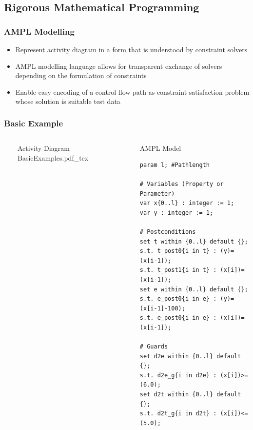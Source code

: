 \documentclass{beamer}
\begin{document}
\subsection{Rigorous Mathematical Programming}
\begin{frame}
\frametitle{AMPL Modelling}
\begin{itemize}
  \item Represent activity diagram in a form that is understood by constraint solvers
\end{itemize}
\vspace{0.3cm}
\begin{itemize}
  \item AMPL modelling language\cite{AMPL} allows for transparent exchange of solvers depending on the formulation of constraints
  \item Enable easy encoding of a control flow path as constraint satisfaction problem whose solution is suitable test data
\end{itemize}
\end{frame}
\begin{frame}[fragile]
\frametitle{Basic Example}
\begin{columns}
  \ 
	\begin{block}{Activity Diagram} 
	\def\svgwidth{\textwidth}
	\scriptsize
	{BasicExamples.pdf_tex}
	\end{block} 
\column{.56\textwidth} \ 
	\begin{block}{AMPL Model} 
		\begin{lstlisting}[basicstyle=\ttfamily\scriptsize,language=ampl]
param l; #Pathlength

# Variables (Property or Parameter)
var x{0..l} : integer := 1;
var y : integer := 1;

# Postconditions
set t within {0..l} default {};
s.t. t_post0{i in t} : (y)=(x[i-1]);
s.t. t_post1{i in t} : (x[i])=(x[i-1]);
set e within {0..l} default {};
s.t. e_post0{i in e} : (y)=(x[i-1]-100);
s.t. e_post0{i in e} : (x[i])=(x[i-1]);

# Guards
set d2e within {0..l} default {};
s.t. d2e_g{i in d2e} : (x[i])>=(6.0);
set d2t within {0..l} default {};
s.t. d2t_g{i in d2t} : (x[i])<=(5.0);
\end{lstlisting}
	\end{block} 
\end{columns}
\end{frame}
\end{document}
